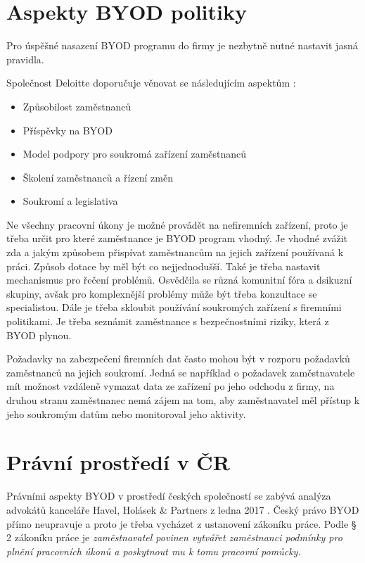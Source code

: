 \section{Aspekty BYOD politiky}

Pro úspěšné nasazení BYOD programu do firmy je nezbytně nutné nastavit jasná pravidla.

Společnost Deloitte doporučuje věnovat se následujícím aspektům :
\begin{itemize}\label{deloitte_aspekty}
\item Způsobilost zaměstnanců
\item Příspěvky na BYOD
\item Model podpory pro soukromá zařízení zaměstnanců
\item Školení zaměstnanců a řízení změn
\item Soukromí a legislativa
\end{itemize}

Ne všechny pracovní úkony je možné provádět na nefiremních zařízení, proto je třeba určit pro které zaměstnance je BYOD program vhodný. 
Je vhodné zvážit zda a jakým způsobem přispívat zaměstnancům na jejich zařízení používaná k práci. Způsob dotace by měl být co nejjednodušší. Také je třeba nastavit mechanismus pro řečení problémů. Osvědčila se různá komunitní fóra a dsikuzní skupiny, avšak pro komplexnější problémy může být třeba konzultace se specialistou. Dále je třeba skloubit používání soukromých zařízení s firemními politikami. Je třeba seznámit zaměstnance s bezpečnostními riziky, která z BYOD plynou. 

Požadavky na zabezpečení firemních dat často mohou být v rozporu požadavků zaměstnanců na jejich soukromí. Jedná se například o požadavek zaměstnavatele mít možnost vzdáleně vymazat data ze zařízení po jeho odchodu z firmy, na druhou stranu zaměstnanec nemá zájem na tom, aby zaměstnavatel měl přístup k jeho soukromým datům nebo monitoroval jeho aktivity.

\section{Právní prostředí v ČR}

Právními aspekty BYOD v prostředí českých společností se zabývá analýza advokátů kanceláře Havel, Holásek \& Partners z ledna 2017 . Český právo BYOD přímo neupravuje a proto je třeba vycházet z ustanovení zákoníku práce. Podle § 2 zákoníku práce je \textit{zaměstnavatel povinen vytvářet zaměstnanci podmínky pro plnění pracovních úkonů a poskytnout mu k tomu pracovní pomůcky.}

